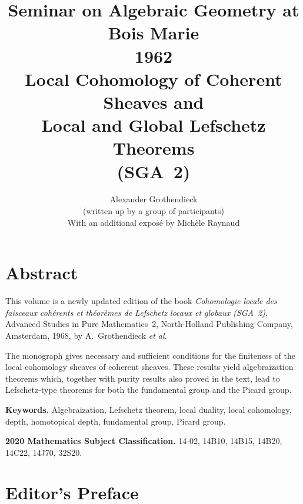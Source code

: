 \documentclass[11pt,a4paper,oneside]{book}
\begin{document}
\frontmatter

\title{Seminar on Algebraic Geometry at Bois Marie\\
   1962\\[0.4em]
   Local Cohomology of Coherent Sheaves and\\
   Local and Global Lefschetz Theorems\\
   (SGA~2)}

\author{Alexander Grothendieck\\
  {\small (written up by a group of participants)}\\[0.5em]
  With an additional expos\'e by Mich\`ele Raynaud}

\date{}

\maketitle

\chapter*{Abstract}
This volume is a newly updated edition of the book
\emph{Cohomologie locale des faisceaux coh\'erents et th\'eor\`emes de
Lefschetz locaux et globaux (SGA~2)}, Advanced Studies in Pure Mathematics~2,
North-Holland Publishing Company, Amsterdam, 1968, by A.~Grothendieck
\emph{et al.}

The monograph gives necessary and sufficient conditions for the finiteness
of the local cohomology sheaves of coherent sheaves. These results yield
algebraization theorems which, together with purity results also proved in
the text, lead to Lefschetz-type theorems for both the fundamental group and
the Picard group.

\medskip
\noindent\textbf{Keywords.} Algebraization, Lefschetz theorem, local duality,
local cohomology, depth, homotopical depth, fundamental group, Picard group.

\smallskip
\noindent\textbf{2020 Mathematics Subject Classification.}
14-02, 14B10, 14B15, 14B20, 14C22, 14J70, 32S20.

\chapter*{Editor's Preface}
\end{document}
